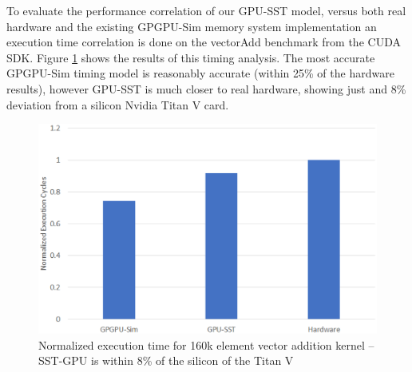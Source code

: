 To evaluate the performance correlation of our GPU-SST model, versus both real
hardware and the existing GPGPU-Sim memory system implementation an execution
time correlation is done on the vectorAdd benchmark from the CUDA SDK. Figure
\ref{fig:titanv_result} shows the results of this timing analysis. The most
accurate GPGPU-Sim timing model is reasonably accurate (within 25\% of the
hardware results), however GPU-SST is much closer to real hardware, showing
just and 8\% deviation from a silicon Nvidia Titan V card.


   \begin{figure}[!htb]
      \centering
      \setlength{\abovecaptionskip}{6pt plus 1pt minus 1pt}
      \includegraphics[width=.50\textwidth,keepaspectratio]{figures/4_1.eps}
      \captionsetup{width=.90\textwidth}
      \caption{Normalized execution time for 160k element vector addition kernel -- \\
               SST-GPU is within 8\% of the silicon of the Titan V}
      \label{fig:titanv_result}
   \end{figure}
